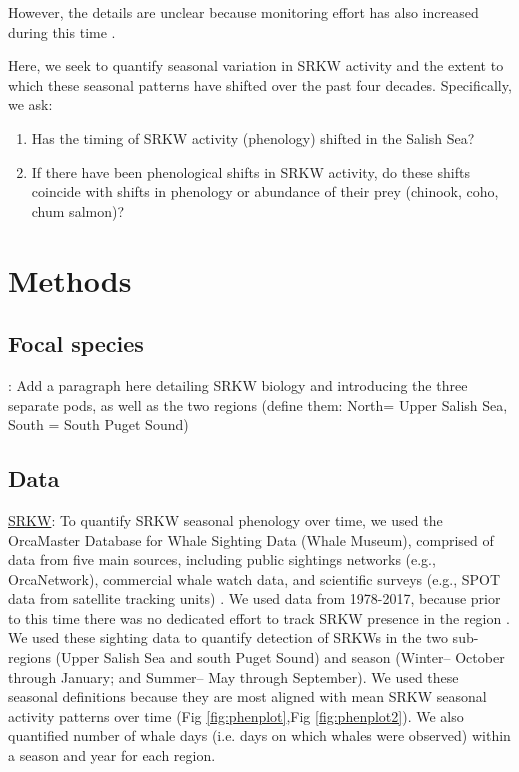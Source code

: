 \documentclass{article}
\begin{document}
However, the details are unclear because monitoring effort has also increased during this time \citep{olson2018, strebel2014}. 
\par Here, we seek to quantify seasonal variation in SRKW activity and the extent to which these seasonal patterns have shifted over the past four decades.  %
Specifically, we ask:
\begin{enumerate}
\item Has the timing of SRKW activity (phenology) shifted in the Salish Sea? 
\item If there have been phenological shifts in SRKW activity, do these shifts coincide with shifts in phenology or abundance of their prey (chinook, coho, chum salmon)?
\end{enumerate}

\section* {Methods}
\subsection*{Focal species}:
Add a paragraph here detailing SRKW biology and introducing the three separate pods, as well as the two regions (define them: North= Upper Salish Sea, South = South Puget Sound)

\subsection* {Data}

\par \underline{SRKW}: To quantify SRKW seasonal phenology over time, we used the OrcaMaster Database for Whale Sighting Data (Whale Museum), comprised of data from five main sources, including public sightings networks (e.g., OrcaNetwork), commercial whale watch data, and scientific surveys (e.g., SPOT data from satellite tracking units) \citep{olson2018}. We used data from 1978-2017, because prior to this time there was no dedicated effort to track SRKW presence in the region \citep{olson2018}. We used these sighting data to quantify %
detection of SRKWs in the two sub-regions (Upper Salish Sea and south Puget Sound) and season (Winter-- October through January; and Summer-- May through September). We used these seasonal definitions because they are most aligned with mean SRKW seasonal activity patterns over time (Fig \ref{fig:phenplot},Fig \ref{fig:phenplot2}).  We also quantified number of whale days (i.e. days on which whales were observed) within a season and year for each region. 
\end{document}
